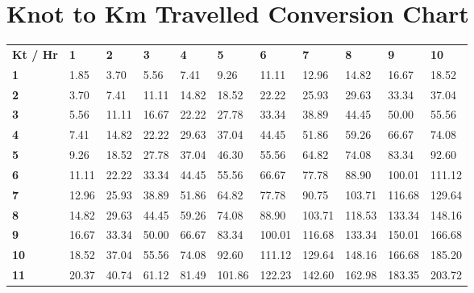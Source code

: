\documentclass{article}
\begin{document}
\section{Knot to Km Travelled Conversion Chart}
\begin{table}[h]
\centering
\label{my-label}
\begin{tabular}{lllllllllll}
\textbf{Kt / Hr} & \textbf{1} & \textbf{2} & \textbf{3} & \textbf{4} & \textbf{5} & \textbf{6} & \textbf{7} & \textbf{8} & \textbf{9} & \textbf{10} \\
\textbf{1}       & 1.85       & 3.70       & 5.56       & 7.41       & 9.26       & 11.11      & 12.96      & 14.82      & 16.67      & 18.52       \\
\textbf{2}       & 3.70       & 7.41       & 11.11      & 14.82      & 18.52      & 22.22      & 25.93      & 29.63      & 33.34      & 37.04       \\
\textbf{3}       & 5.56       & 11.11      & 16.67      & 22.22      & 27.78      & 33.34      & 38.89      & 44.45      & 50.00      & 55.56       \\
\textbf{4}       & 7.41       & 14.82      & 22.22      & 29.63      & 37.04      & 44.45      & 51.86      & 59.26      & 66.67      & 74.08       \\
\textbf{5}       & 9.26       & 18.52      & 27.78      & 37.04      & 46.30      & 55.56      & 64.82      & 74.08      & 83.34      & 92.60       \\
\textbf{6}       & 11.11      & 22.22      & 33.34      & 44.45      & 55.56      & 66.67      & 77.78      & 88.90      & 100.01     & 111.12      \\
\textbf{7}       & 12.96      & 25.93      & 38.89      & 51.86      & 64.82      & 77.78      & 90.75      & 103.71     & 116.68     & 129.64      \\
\textbf{8}       & 14.82      & 29.63      & 44.45      & 59.26      & 74.08      & 88.90      & 103.71     & 118.53     & 133.34     & 148.16      \\
\textbf{9}       & 16.67      & 33.34      & 50.00      & 66.67      & 83.34      & 100.01     & 116.68     & 133.34     & 150.01     & 166.68      \\
\textbf{10}      & 18.52      & 37.04      & 55.56      & 74.08      & 92.60      & 111.12     & 129.64     & 148.16     & 166.68     & 185.20      \\
\textbf{11}      & 20.37      & 40.74      & 61.12      & 81.49      & 101.86     & 122.23     & 142.60     & 162.98     & 183.35     & 203.72      \\

\end{tabular}
\end{table}
\end{document}
